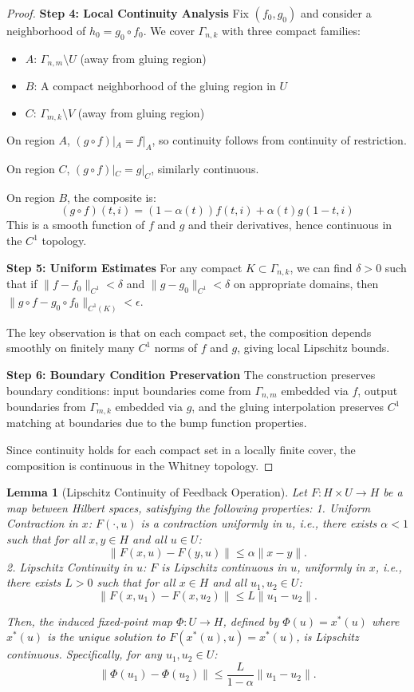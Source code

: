 \documentclass[11pt]{article}
\newtheorem{lemma}{Lemma}
\begin{document}
\begin{proof}
\noindent\textbf{Step 4: Local Continuity Analysis}
Fix $(f_0, g_0)$ and consider a neighborhood of $h_0 = g_0 \circ f_0$. We cover $\Gamma_{n,k}$ with three compact families:
\begin{itemize}
    \item $A$: $\Gamma_{n,m} \setminus U$ (away from gluing region)
    \item $B$: A compact neighborhood of the gluing region in $U$
    \item $C$: $\Gamma_{m,k} \setminus V$ (away from gluing region)
\end{itemize}

On region $A$, $(g \circ f)|_A = f|_A$, so continuity follows from continuity of restriction.

On region $C$, $(g \circ f)|_C = g|_C$, similarly continuous.

On region $B$, the composite is:
\[
(g \circ f)(t,i) = (1-\alpha(t))f(t,i) + \alpha(t)g(1-t,i)
\]
This is a smooth function of $f$ and $g$ and their derivatives, hence continuous in the $C^1$ topology.

\noindent\textbf{Step 5: Uniform Estimates}
For any compact $K \subset \Gamma_{n,k}$, we can find $\delta > 0$ such that if $\|f - f_0\|_{C^1} < \delta$ and $\|g - g_0\|_{C^1} < \delta$ on appropriate domains, then $\|g \circ f - g_0 \circ f_0\|_{C^1(K)} < \epsilon$.

The key observation is that on each compact set, the composition depends smoothly on finitely many $C^1$ norms of $f$ and $g$, giving local Lipschitz bounds.

\noindent\textbf{Step 6: Boundary Condition Preservation}
The construction preserves boundary conditions: input boundaries come from $\Gamma_{n,m}$ embedded via $f$, output boundaries from $\Gamma_{m,k}$ embedded via $g$, and the gluing interpolation preserves $C^1$ matching at boundaries due to the bump function properties.

Since continuity holds for each compact set in a locally finite cover, the composition is continuous in the Whitney topology.
\end{proof}

\begin{lemma}[Lipschitz Continuity of Feedback Operation]\label{lem:feedback-continuity}
Let $F : H \times U \to H$ be a map between Hilbert spaces, satisfying the following properties:
1.  Uniform Contraction in $x$: $F(\cdot, u)$ is a contraction uniformly in $u$, i.e., there exists $\alpha < 1$ such that for all $x, y \in H$ and all $u \in U$:
    \[
    \|F(x, u) - F(y, u)\| \le \alpha \|x - y\|.
    \]
2.  Lipschitz Continuity in $u$: $F$ is Lipschitz continuous in $u$, uniformly in $x$, i.e., there exists $L > 0$ such that for all $x \in H$ and all $u_1, u_2 \in U$:
    \[
    \|F(x, u_1) - F(x, u_2)\| \le L \|u_1 - u_2\|.
    \]

Then, the induced fixed-point map $\Phi : U \to H$, defined by $\Phi(u) = x^*(u)$ where $x^*(u)$ is the unique solution to $F(x^*(u), u) = x^*(u)$, is Lipschitz continuous. Specifically, for any $u_1, u_2 \in U$:
\[
\|\Phi(u_1) - \Phi(u_2)\| \le \frac{L}{1-\alpha} \|u_1 - u_2\|.
\]
\end{lemma}
\end{document}
